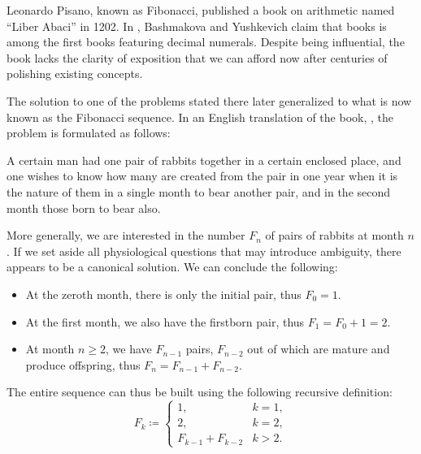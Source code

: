 \begin{example}\label{ex:fibonacci_rabbits}
  Leonardo Pisano, known as Fibonacci, published a book on arithmetic named \enquote{Liber Abaci} in 1202. In \cite[54]{АлександровМаркушевичХинчин1951ЭнциклопедияТом1}, Bashmakova and Yushkevich claim that books is among the first books featuring decimal numerals. Despite being influential, the book lacks the clarity of exposition that we can afford now after centuries of polishing existing concepts.

  The solution to one of the problems stated there later generalized to what is now known as the Fibonacci sequence. In an English translation of the book, \cite{Sigler2002LiberAbaci}, the problem is formulated as follows:
  \begin{displayquote}
    A certain man had one pair of rabbits together in a certain enclosed place, and one wishes to know how many are created from the pair in one year when it is the nature of them in a single month to bear another pair, and in the second month those born to bear also.
  \end{displayquote}

  More generally, we are interested in the number \( F_n \) of pairs of rabbits at month \( n \). If we set aside all physiological questions that may introduce ambiguity, there appears to be a canonical solution. We can conclude the following:
  \begin{itemize}
    \item At the zeroth month, there is only the initial pair, thus \( F_0 = 1 \).

    \item At the first month, we also have the firstborn pair, thus \( F_1 = F_0 + 1 = 2 \).

    \item At month \( n \geq 2 \), we have \( F_{n-1} \) pairs, \( F_{n-2} \) out of which are mature and produce offspring, thus \( F_n = F_{n-1} + F_{n-2} \).
  \end{itemize}

  The entire sequence can thus be built using the following recursive definition:
  \begin{equation*}
    F_k \coloneqq \begin{cases}
      1,                &k = 1, \\
      2,                &k = 2, \\
      F_{k-1} + F_{k-2} &k > 2.
    \end{cases}
  \end{equation*}


\end{example}

